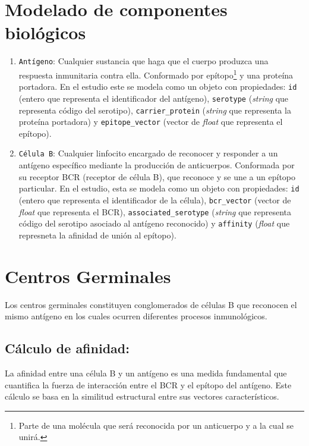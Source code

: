 \section{Modelado de componentes biológicos}
\begin{enumerate}
    
    \item \texttt{Antígeno}: Cualquier sustancia que haga que el cuerpo produzca una respuesta inmunitaria contra ella. Conformado por epítopo\footnote{Parte de una molécula que será reconocida por un anticuerpo y a la cual se unirá.} y una proteína portadora. En el estudio este se modela como un objeto con propiedades: \texttt{id} (entero que representa el identificador del antígeno), \texttt{serotype} (\textit{string} que representa código del serotipo), \texttt{carrier\_protein} (\textit{string} que representa la proteína portadora) y \texttt{epitope\_vector} (vector de \textit{float} que representa el epítopo).
    \item \texttt{Célula B}: Cualquier linfocito encargado de reconocer y responder a un antígeno específico mediante la producción de anticuerpos. Conformada por su receptor BCR  (receptor de célula B), que reconoce y se une a un epítopo  particular. En el estudio, esta se modela como un objeto con propiedades: \texttt{id} (entero que representa el identificador de la célula), \texttt{bcr\_vector} (vector de \textit{float} que representa el  BCR), \texttt{associated\_serotype} (\textit{string} que representa código del serotipo asociado al antígeno reconocido) y \texttt{affinity} (\textit{float} que represneta la afinidad de unión al epítopo).
\end{enumerate}

    


\section{Centros Germinales}

Los centros germinales constituyen conglomerados de células B que reconocen el mismo antígeno en los cuales ocurren diferentes procesos inmunológicos.

    \subsection*{Cálculo de afinidad:}

    La afinidad entre una célula B y un antígeno es una medida fundamental que cuantifica la fuerza de interacción entre el BCR y el epítopo del antígeno. Este cálculo se basa en la similitud estructural entre sus vectores característicos.

